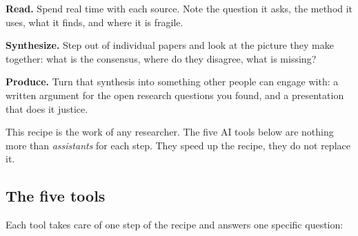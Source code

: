 \documentclass[11pt,a4paper]{article}
\begin{document}
\textbf{Read.} Spend real time with each source. Note the question it asks, the method it uses, what it finds, and where it is fragile.

\textbf{Synthesize.} Step out of individual papers and look at the picture they make together: what is the consensus, where do they disagree, what is missing?

\textbf{Produce.} Turn that synthesis into something other people can engage with: a written argument for the open research questions you found, and a presentation that does it justice.

This recipe is the work of any researcher. The five AI tools below are nothing more than \emph{assistants} for each step. They speed up the recipe, they do not replace it.

\subsection{The five tools}

Each tool takes care of one step of the recipe and answers one specific question:
\end{document}
